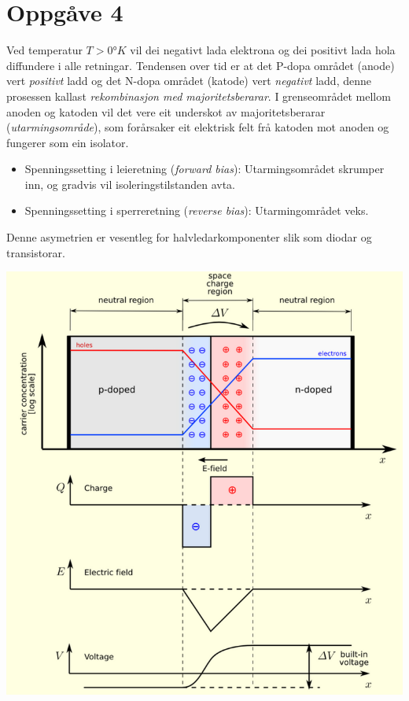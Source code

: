 \documentclass[12pt,a4paper]{article}
\begin{document}
  \section*{Oppgåve 4}
    Ved temperatur $T > \ang{0} K$ vil dei negativt lada elektrona og dei
    positivt lada hola diffundere i alle retningar. Tendensen over tid er at
    det P-dopa området (anode) vert \textit{positivt} ladd og det N-dopa
    området (katode) vert \textit{negativt} ladd, denne prosessen kallast
    \textit{rekombinasjon med majoritetsberarar}. I grenseområdet mellom anoden
    og katoden vil det vere eit underskot av majoritetsberarar
    (\textit{utarmingsområde}), som forårsaker eit elektrisk felt frå katoden
    mot anoden og fungerer som ein isolator. 
    \begin{itemize}
      \item Spenningssetting i leieretning (\textit{forward bias}): Utarmingsområdet
        skrumper inn, og gradvis vil isoleringstilstanden avta.
      \item Spenningssetting i sperreretning (\textit{reverse bias}): Utarmingområdet
        veks.
    \end{itemize}

    Denne asymetrien er vesentleg for halvledarkomponenter slik som diodar og transistorar.
    \begin{center}
      \includegraphics[scale=0.4]{01_04.png}
    \end{center}
\end{document}
